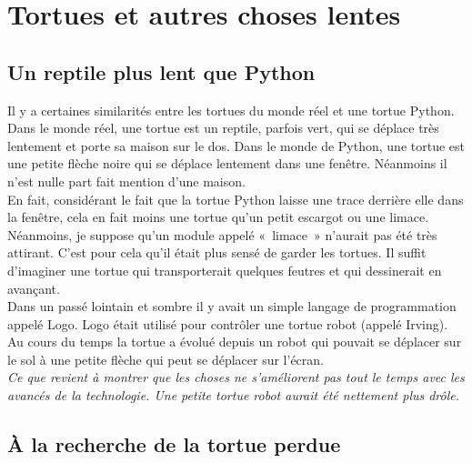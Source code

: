


\chapter{Tortues et autres choses lentes\label{chap:tortue1}}
\section{Un reptile plus lent que Python}
Il y a certaines similarités entre les tortues du monde réel et une tortue Python.
Dans le monde réel, une tortue   est un reptile, parfois vert, qui se déplace très lentement et porte sa maison sur le dos. Dans le monde de Python, une tortue est une petite flèche noire qui se déplace lentement dans une fenêtre. Néanmoins il n'est nulle part fait mention d'une maison.\\

En fait, considérant le fait que la tortue Python laisse une trace derrière elle dans la fenêtre, cela en fait moins une tortue qu'un petit escargot ou une limace. Néanmoins, je suppose qu'un module appelé «~limace~»  n'aurait pas été très attirant. C'est pour cela qu'il était plus sensé de garder les tortues. Il suffit d'imaginer une tortue qui transporterait quelques feutres et qui dessinerait en avançant.\\

Dans un passé lointain et sombre il y avait un simple langage de programmation appelé Logo. Logo était utilisé pour contrôler une tortue robot (appelé Irving). Au cours du temps la tortue a évolué depuis un robot qui pouvait se déplacer sur le sol à une petite flèche qui peut se déplacer sur l'écran.\\

\emph{Ce que revient à montrer que les choses ne s'améliorent pas tout le temps avec les avancés de la technologie. Une petite tortue robot aurait été nettement plus drôle.}\\

\section{À la recherche de la tortue perdue}

